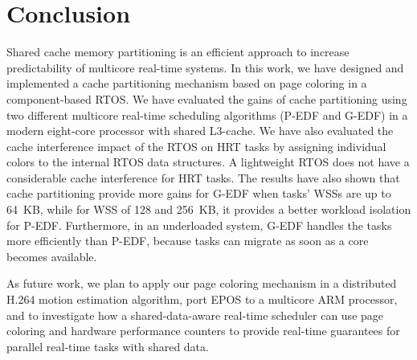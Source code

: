 \documentclass[10pt, conference, compsocconf]{IEEEtran}
\begin{document}
\section{Conclusion}
\label{sec:conc}

Shared cache memory partitioning is an efficient approach to increase predictability of multicore real-time systems. In this work, we have designed and implemented a cache partitioning mechanism based on page coloring in a component-based RTOS. We have evaluated the gains of cache partitioning using two different multicore real-time scheduling algorithms (P-EDF and G-EDF) in a modern eight-core processor with shared L3-cache. We have also evaluated the cache interference impact of the RTOS on HRT tasks by assigning individual colors to the internal RTOS data structures. A lightweight RTOS does not have a considerable cache interference for HRT tasks. The results have also shown that cache partitioning provide more gains for G-EDF when tasks' WSSs are up to 64~KB, while for WSS of 128 and 256~KB, it provides a better workload isolation for P-EDF. Furthermore, in an underloaded system, G-EDF handles the tasks more efficiently than P-EDF, because tasks can migrate as soon as a core becomes available.

As future work, we plan to apply our page coloring mechanism in a distributed H.264 motion estimation algorithm, port EPOS to a multicore ARM processor, and to investigate how a shared-data-aware real-time scheduler can use page coloring and hardware performance counters to provide real-time guarantees for parallel real-time tasks with shared data.







\end{document}
